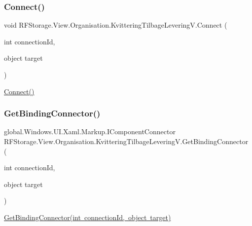 \subsubsection{\texorpdfstring{Connect()}{Connect()}}
{\footnotesize\ttfamily void R\+F\+Storage.\+View.\+Organisation.\+Kvittering\+Tilbage\+Levering\+V.\+Connect (\begin{DoxyParamCaption}\item[{int}]{connection\+Id,  }\item[{object}]{target }\end{DoxyParamCaption})}



\mbox{\hyperlink{class_r_f_storage_1_1_view_1_1_organisation_1_1_kvittering_tilbage_levering_v_acdbb1f8bd9f4f172682737d1ba1ce0a4}{Connect()}} 

\mbox{\label{class_r_f_storage_1_1_view_1_1_organisation_1_1_kvittering_tilbage_levering_v_ac40b6d11d599cc329e4907151ea880b8}} 
\subsubsection{\texorpdfstring{GetBindingConnector()}{GetBindingConnector()}}
{\footnotesize\ttfamily global.\+Windows.\+U\+I.\+Xaml.\+Markup.\+I\+Component\+Connector R\+F\+Storage.\+View.\+Organisation.\+Kvittering\+Tilbage\+Levering\+V.\+Get\+Binding\+Connector (\begin{DoxyParamCaption}\item[{int}]{connection\+Id,  }\item[{object}]{target }\end{DoxyParamCaption})}



\mbox{\hyperlink{class_r_f_storage_1_1_view_1_1_organisation_1_1_kvittering_tilbage_levering_v_ac40b6d11d599cc329e4907151ea880b8}{Get\+Binding\+Connector(int connection\+Id, object target)}} 

\mbox{\label{class_r_f_storage_1_1_view_1_1_organisation_1_1_kvittering_tilbage_levering_v_ac8081ea290369eea79258d4819f6ac6d}} 
